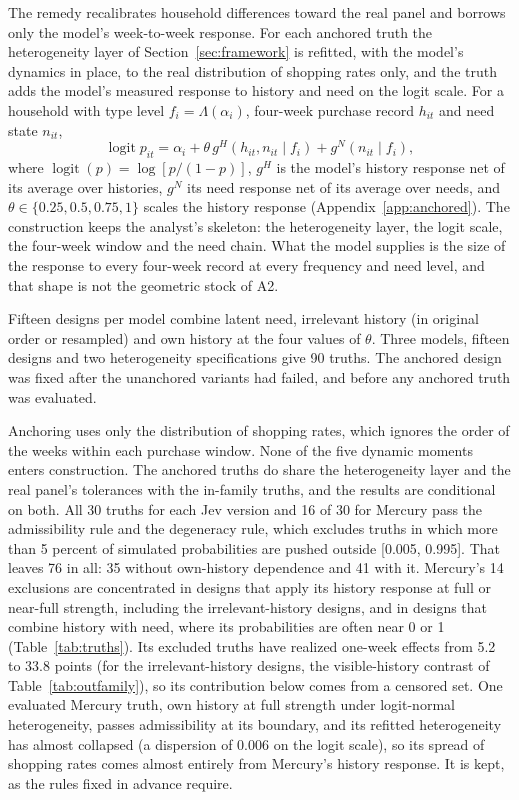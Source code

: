 \documentclass[11pt]{article}
\begin{document}
The remedy recalibrates household differences toward the real panel and borrows only the
model's week-to-week response. For each anchored truth the heterogeneity layer of
Section~\ref{sec:framework} is refitted, with the model's dynamics in place, to the real
distribution of shopping rates only, and the truth adds the model's measured response to history and need on the logit scale. For a household
with type level $f_i=\Lambda(\alpha_i)$, four-week purchase record $h_{it}$ and need state
$n_{it}$,
\begin{equation}
\operatorname{logit} p_{it}=\alpha_i+\theta\, g^{H}(h_{it},n_{it}\mid f_i)+g^{N}(n_{it}\mid f_i),
\label{eq:anchored}
\end{equation}
where $\operatorname{logit}(p)=\log[p/(1-p)]$, $g^H$ is the model's history response net of its average over histories, $g^N$ its need
response net of its average over needs, and $\theta\in\{0.25,0.5,0.75,1\}$ scales the history
response (Appendix~\ref{app:anchored}). The construction keeps the analyst's skeleton: the
heterogeneity layer, the logit scale, the four-week window and the need chain. What the model
supplies is the size of the response to every four-week record at every frequency and need
level, and that shape is not the geometric stock of A2.

Fifteen designs per model combine latent need, irrelevant history (in original order or
resampled) and own history at the four values of $\theta$. Three models, fifteen designs and two heterogeneity specifications give 90 truths.
The anchored design was fixed after the unanchored variants had failed, and before any
anchored truth was evaluated.

Anchoring uses only the distribution of shopping rates, which ignores the order of the weeks
within each purchase window.
None of the five dynamic moments enters construction. The anchored truths do share the
heterogeneity layer and the real panel's tolerances with the in-family truths, and the results
are conditional on both. All 30 truths for each Jev version and 16 of 30 for Mercury pass the
admissibility rule and the degeneracy rule, which excludes truths in which more than 5 percent
of simulated probabilities are pushed outside [0.005, 0.995]. That leaves 76 in all: 35 without
own-history dependence and 41 with it. Mercury's 14 exclusions are concentrated in designs that
apply its history response at full or near-full strength, including the irrelevant-history
designs, and in designs that combine history with need, where its probabilities are often near
0 or 1 (Table~\ref{tab:truths}). Its excluded truths have realized one-week effects from 5.2 to 33.8 points (for the
irrelevant-history designs, the visible-history contrast of Table~\ref{tab:outfamily}), so its
contribution below comes from a censored set. One evaluated Mercury truth, own history at full
strength under logit-normal heterogeneity, passes admissibility at its boundary, and its refitted
heterogeneity has almost collapsed (a dispersion of 0.006 on the logit scale), so its spread of
shopping rates comes almost entirely from Mercury's history response. It is kept, as the rules
fixed in advance require.
\end{document}
